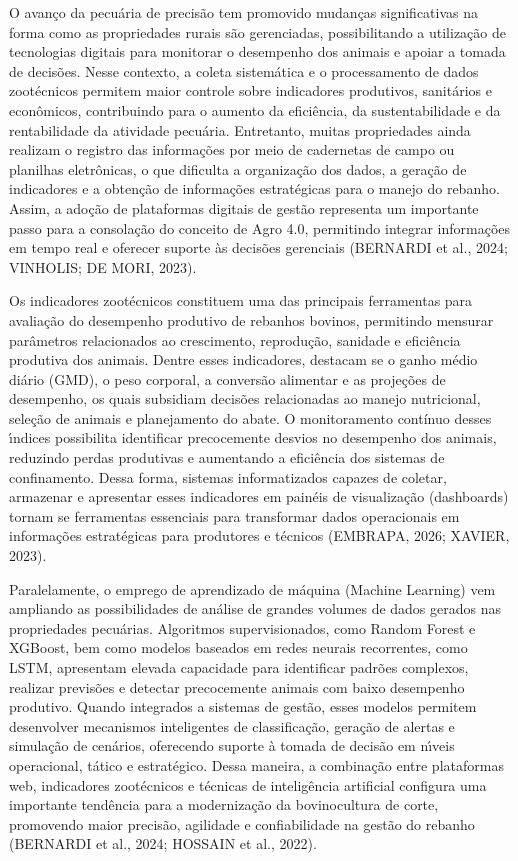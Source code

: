 \documentclass[12pt,a4paper]{article}
\begin{document}
O avan\c co da pecu\'aria de precis\~ao tem promovido mudan\c cas significativas na forma como as propriedades rurais s\~ao gerenciadas, possibilitando a utiliza\c c\~ao de tecnologias digitais para monitorar o desempenho dos animais e apoiar a tomada de decis\~oes. Nesse contexto, a coleta sistem\'atica e o processamento de dados zoot\'ecnicos permitem maior controle sobre indicadores produtivos, sanit\'arios e econ\^omicos, contribuindo para o aumento da efici\^encia, da sustentabilidade e da rentabilidade da atividade pecu\'aria. Entretanto, muitas propriedades ainda realizam o registro das informa\c c\~oes por meio de cadernetas de campo ou planilhas eletr\^onicas, o que dificulta a organiza\c c\~ao dos dados, a gera\c c\~ao de indicadores e a obten\c c\~ao de informa\c c\~oes estrat\'egicas para o manejo do rebanho. Assim, a ado\c c\~ao de plataformas digitais de gest\~ao representa um importante passo para a consola\c c\~ao do conceito de Agro 4.0, permitindo integrar informa\c c\~oes em tempo real e oferecer suporte \`as decis\~oes gerenciais (BERNARDI et al., 2024; VINHOLIS; DE MORI, 2023).

Os indicadores zoot\'ecnicos constituem uma das principais ferramentas para avalia\c c\~ao do desempenho produtivo de rebanhos bovinos, permitindo mensurar par\^ametros relacionados ao crescimento, reprodu\c c\~ao, sanidade e efici\^encia produtiva dos animais. Dentre esses indicadores, destacam se o ganho m\'edio di\'ario (GMD), o peso corporal, a convers\~ao alimentar e as proje\c c\~oes de desempenho, os quais subsidiam decis\~oes relacionadas ao manejo nutricional, sele\c c\~ao de animais e planejamento do abate. O monitoramento cont\'inuo desses \'{\i}ndices possibilita identificar precocemente desvios no desempenho dos animais, reduzindo perdas produtivas e aumentando a efici\^encia dos sistemas de confinamento. Dessa forma, sistemas informatizados capazes de coletar, armazenar e apresentar esses indicadores em pain\'eis de visualiza\c c\~ao (dashboards) tornam se ferramentas essenciais para transformar dados operacionais em informa\c c\~oes estrat\'egicas para produtores e t\'ecnicos (EMBRAPA, 2026; XAVIER, 2023).

Paralelamente, o emprego de aprendizado de m\'aquina (Machine Learning) vem ampliando as possibilidades de an\'alise de grandes volumes de dados gerados nas propriedades pecu\'arias. Algoritmos supervisionados, como Random Forest e XGBoost, bem como modelos baseados em redes neurais recorrentes, como LSTM, apresentam elevada capacidade para identificar padr\~oes complexos, realizar previs\~oes e detectar precocemente animais com baixo desempenho produtivo. Quando integrados a sistemas de gest\~ao, esses modelos permitem desenvolver mecanismos inteligentes de classifica\c c\~ao, gera\c c\~ao de alertas e simula\c c\~ao de cen\'arios, oferecendo suporte \`a tomada de decis\~ao em n\'{\i}veis operacional, t\'atico e estrat\'egico. Dessa maneira, a combina\c c\~ao entre plataformas web, indicadores zoot\'ecnicos e t\'ecnicas de intelig\^encia artificial configura uma importante tend\^encia para a moderniza\c c\~ao da bovinocultura de corte, promovendo maior precis\~ao, agilidade e confiabilidade na gest\~ao do rebanho (BERNARDI et al., 2024; HOSSAIN et al., 2022).
\end{document}
